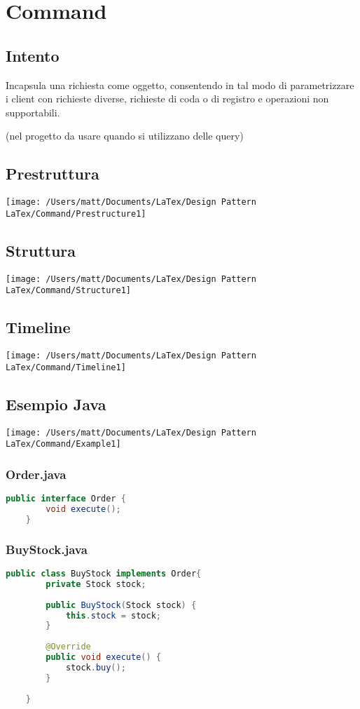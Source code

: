 \chapter{Command}
\section{Intento}

Incapsula una richiesta come oggetto, consentendo in tal modo di parametrizzare i client con richieste diverse, richieste di coda o di registro e operazioni non supportabili.

(nel progetto da usare quando si utilizzano delle query)


\section{Prestruttura}

\texttt{[image: /Users/matt/Documents/LaTex/Design Pattern LaTex/Command/Prestructure1]}


\section{Struttura}

\texttt{[image: /Users/matt/Documents/LaTex/Design Pattern LaTex/Command/Structure1]}


\section{Timeline}

\texttt{[image: /Users/matt/Documents/LaTex/Design Pattern LaTex/Command/Timeline1]}


\section{Esempio Java}
\texttt{[image: /Users/matt/Documents/LaTex/Design Pattern LaTex/Command/Example1]}

\subsection{Order.java}
\begin{lstlisting}[language=java]
    public interface Order {
        void execute();
    }
\end{lstlisting}

\subsection{BuyStock.java}
\begin{lstlisting}[language=java]
    public class BuyStock implements Order{
        private Stock stock;
    
        public BuyStock(Stock stock) {
            this.stock = stock;
        }
    
        @Override
        public void execute() {
            stock.buy();
        }
        
    }
\end{lstlisting}


